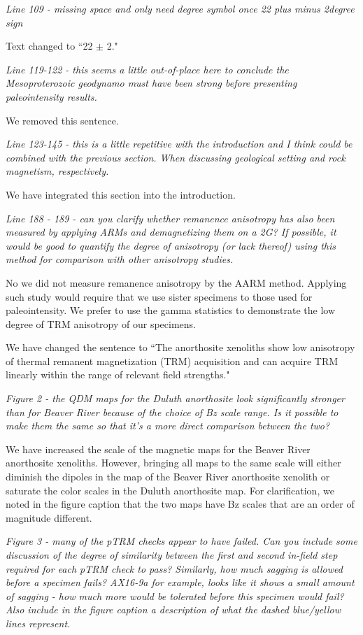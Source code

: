 \documentclass[11pt, letterpaper]{article}
\begin{document}
\begin{flushleft}
\textit{Line 109 - missing space and only need degree symbol once 22 {plus minus} 2{degree sign}}

Text changed to ``22 $\pm$ 2\textdegree."

\textit{Line 119-122 - this seems a little out-of-place here to conclude the Mesoproterozoic geodynamo must have been strong before presenting paleointensity results.}

We removed this sentence. 

\textit{Line 123-145 - this is a little repetitive with the introduction and I think could be combined with the previous section. When discussing geological setting and rock magnetism, respectively.}

We have integrated this section into the introduction. 

\textit{Line 188 - 189 - can you clarify whether remanence anisotropy has also been measured by applying ARMs and demagnetizing them on a 2G? If possible, it would be good to quantify the degree of anisotropy (or lack thereof) using this method for comparison with other anisotropy studies.}

No we did not measure remanence anisotropy by the AARM method. Applying such study would require that we use sister specimens to those used for paleointensity. We prefer to use the gamma statistics to demonstrate the low degree of TRM anisotropy of our specimens. 

We have changed the sentence to ``The anorthosite xenoliths show low anisotropy of thermal remanent magnetization (TRM) acquisition and can acquire TRM linearly within the range of relevant field strengths."

\textit{Figure 2 - the QDM maps for the Duluth anorthosite look significantly stronger than for Beaver River because of the choice of Bz scale range. Is it possible to make them the same so that it's a more direct comparison between the two?}

We have increased the scale of the magnetic maps for the Beaver River anorthosite xenoliths. However, bringing all maps to the same scale will either diminish the dipoles in the map of the Beaver River anorthosite xenolith or saturate the color scales in the Duluth anorthosite map. For clarification, we noted in the figure caption that the two maps have Bz scales that are an order of magnitude different.

\textit{Figure 3 - many of the pTRM checks appear to have failed. Can you include some discussion of the degree of similarity between the first and second in-field step required for each pTRM check to pass? Similarly, how much sagging is allowed before a specimen fails? AX16-9a for example, looks like it shows a small amount of sagging - how much more would be tolerated before this specimen would fail? Also include in the figure caption a description of what the dashed blue/yellow lines represent.}


\end{flushleft}
\end{document}
